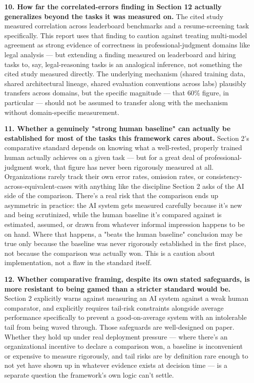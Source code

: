 \textbf{10. How far the correlated-errors finding in Section 12 actually generalizes beyond the tasks it was measured on.} The cited study measured correlation across leaderboard benchmarks and a resume-screening task specifically. This report uses that finding to caution against treating multi-model agreement as strong evidence of correctness in professional-judgment domains like legal analysis --- but extending a finding measured on leaderboard and hiring tasks to, say, legal-reasoning tasks is an analogical inference, not something the cited study measured directly. The underlying mechanism (shared training data, shared architectural lineage, shared evaluation conventions across labs) plausibly transfers across domains, but the specific magnitude --- that 60\% figure, in particular --- should not be assumed to transfer along with the mechanism without domain-specific measurement.

\textbf{11. Whether a genuinely "strong human baseline" can actually be established for most of the tasks this framework cares about.} Section 2's comparative standard depends on knowing what a well-rested, properly trained human actually achieves on a given task --- but for a great deal of professional-judgment work, that figure has never been rigorously measured at all. Organizations rarely track their own error rates, omission rates, or consistency-across-equivalent-cases with anything like the discipline Section 2 asks of the AI side of the comparison. There's a real risk that the comparison ends up asymmetric in practice: the AI system gets measured carefully because it's new and being scrutinized, while the human baseline it's compared against is estimated, assumed, or drawn from whatever informal impression happens to be on hand. Where that happens, a "beats the human baseline" conclusion may be true only because the baseline was never rigorously established in the first place, not because the comparison was actually won. This is a caution about implementation, not a flaw in the standard itself.

\textbf{12. Whether comparative framing, despite its own stated safeguards, is more resistant to being gamed than a stricter standard would be.} Section 2 explicitly warns against measuring an AI system against a weak human comparator, and explicitly requires tail-risk constraints alongside average performance specifically to prevent a good-on-average system with an intolerable tail from being waved through. Those safeguards are well-designed on paper. Whether they hold up under real deployment pressure --- where there's an organizational incentive to declare a comparison won, a baseline is inconvenient or expensive to measure rigorously, and tail risks are by definition rare enough to not yet have shown up in whatever evidence exists at decision time --- is a separate question the framework's own logic can't settle.

